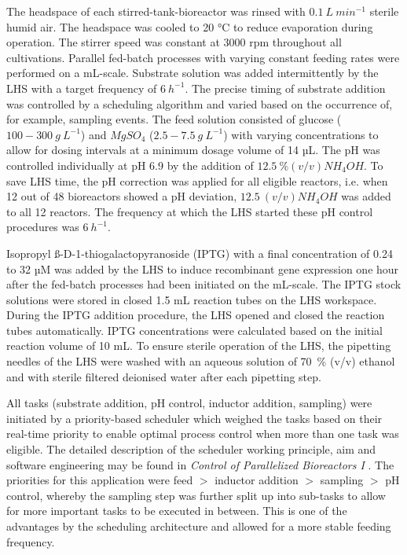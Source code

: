 \documentclass[sn-standardnature]{sn-jnl}%
\theoremstyle{thmstyleone}%
\theoremstyle{thmstyletwo}%
\theoremstyle{thmstylethree}%
\begin{document}
The headspace of each stirred-tank-bioreactor was rinsed with $0.1\ L\ min^{-1}$ sterile humid air.
The headspace was cooled to 20 °C to reduce evaporation during operation.
The stirrer speed was constant at 3000 rpm throughout all cultivations.
Parallel fed-batch processes with varying constant feeding rates were performed on a mL-scale.
Substrate solution was added intermittently by the LHS with a target frequency of $6\ h^{-1}$.
The precise timing of substrate addition was controlled by a scheduling algorithm and varied based on the occurrence of, for example, sampling events.
The feed solution consisted of glucose ($100 - 300\ g\ L^{-1}$) and $MgSO_{4}$ ($2.5 - 7.5\ g\ L^{-1}$) with varying concentrations to allow for dosing intervals at a minimum dosage volume of 14 µL.
The pH was controlled individually at pH 6.9 by the addition of $12.5\ \% (v/v) NH_{4}OH$.
To save LHS time, the pH correction was applied for all eligible reactors, i.e. when 12 out of 48 bioreactors showed a pH deviation, $12.5\ (v/v) NH_{4}OH$ was added to all 12 reactors.
The frequency at which the LHS started these pH control procedures was $6\ h^{-1}$.

Isopropyl ß-D-1-thiogalactopyranoside (IPTG) with a final concentration of 0.24 to 32 µM was added by the LHS to induce recombinant gene expression one hour after the fed-batch processes had been initiated on the mL-scale.
The IPTG stock solutions were stored in closed 1.5 mL reaction tubes on the LHS workspace.
During the IPTG addition procedure, the LHS opened and closed the reaction tubes automatically.
IPTG concentrations were calculated based on the initial reaction volume of 10 mL.
To ensure sterile operation of the LHS, the pipetting needles of the LHS were washed with an aqueous solution of 70~\% (v/v) ethanol and with sterile filtered deionised water after each pipetting step.

All tasks (substrate addition, pH control, inductor addition, sampling) were initiated by a priority-based scheduler which weighed the tasks based on their real-time priority to enable optimal process control when more than one task was eligible.
The detailed description of the scheduler working principle, aim and software engineering may be found in \textit{Control of Parallelized Bioreactors I} \cite{controlOfParallelizedBioreactorsI}.
The priorities for this application were feed $>$ inductor addition $>$ sampling $>$ pH control, whereby the sampling step was further split up into sub-tasks to allow for more important tasks to be executed in between.
This is one of the advantages by the scheduling architecture and allowed for a more stable feeding frequency.
\end{document}
